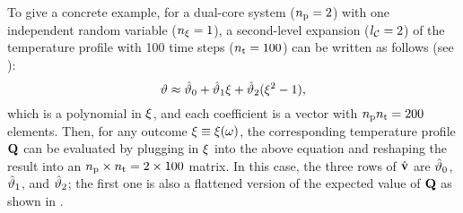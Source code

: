 To give a concrete example, for a dual-core system (${n_\text{p}} = 2$) with one independent random variable (${n_\xi} = 1$), a second-level expansion (${l_\mathcal{C}} = 2$) of the temperature profile with 100 time steps (${n_\text{t}} = 100$) can be written as follows (see ):
\[
  \vartheta \approx \hat{\vartheta}_0 + \hat{\vartheta}_1 \xi + \hat{\vartheta}_2(\xi^2 - 1),
\]
which is a polynomial in $\xi$, and each coefficient is a vector with ${n_\text{p}} {n_\text{t}} = 200$ elements.
Then, for any outcome $\xi \equiv \xi(\omega)$, the corresponding temperature profile $\mathbf{Q}$ can be evaluated by plugging in $\xi$ into the above equation and reshaping the result into an ${n_\text{p}} \times {n_\text{t}} = 2 \times 100$ matrix.
In this case, the three rows of $\hat{\mathbf{v}}$ are $\hat{\vartheta}_0$, $\hat{\vartheta}_1$, and $\hat{\vartheta}_2$; the first one is also a flattened version of the expected value of $\mathbf{Q}$ as shown in .
